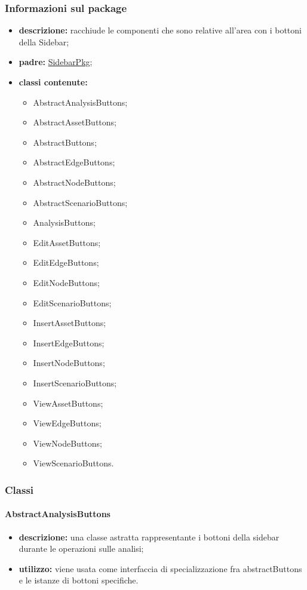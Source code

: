 \subsubsection{Informazioni sul package}
\begin{itemize}
	\item \textbf{descrizione:} racchiude le componenti che sono relative all'area con i bottoni della Sidebar;
	\item \textbf{padre:} \hyperref[pkg::SidebarPkg]{SidebarPkg};
	\item \textbf{classi contenute:}
	\begin{itemize}
		\item AbstractAnalysisButtons;
		\item AbstractAssetButtons;
		\item AbstractButtons;
		\item AbstractEdgeButtons;
		\item AbstractNodeButtons;
		\item AbstractScenarioButtons;
		\item AnalysisButtons;
		\item EditAssetButtons;
		\item EditEdgeButtons;
		\item EditNodeButtons;
		\item EditScenarioButtons;
		\item InsertAssetButtons;
		\item InsertEdgeButtons;
		\item InsertNodeButtons;
		\item InsertScenarioButtons;
		\item ViewAssetButtons;
		\item ViewEdgeButtons;
		\item ViewNodeButtons;
		\item ViewScenarioButtons.
	\end{itemize}
\end{itemize}
\subsubsection{Classi}
\paragraph{AbstractAnalysisButtons}
\begin{itemize}
	\item \textbf{descrizione:} una classe astratta rappresentante i bottoni della sidebar durante le operazioni sulle analisi;
	\item \textbf{utilizzo:} viene usata come interfaccia di specializzazione fra abstractButtons e le istanze di bottoni specifiche.
\end{itemize}
